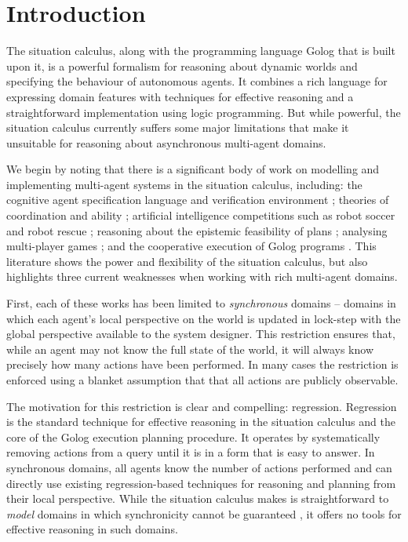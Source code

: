 

\chapter{Introduction}

\label{ch:intro}

The situation calculus, along with the programming language Golog
that is built upon it, is a powerful formalism for reasoning about
dynamic worlds and specifying the behaviour of autonomous agents.
It combines a rich language for expressing domain features with techniques
for effective reasoning and a straightforward implementation using
logic programming. But while powerful, the situation calculus currently
suffers some major limitations that make it unsuitable for reasoning
about asynchronous multi-agent domains.

We begin by noting that there is a significant body of work on modelling
and implementing multi-agent systems in the situation calculus, including:
the cognitive agent specification language and verification environment
\citep{shapiro02casl}; theories of coordination and ability \citep{ghaderi07sc_joint_ability};
artificial intelligence competitions such as robot soccer \citep{Ferrein2005readylog}
and robot rescue \citep{farinelli07team_golog}; reasoning about the
epistemic feasibility of plans \citep{Lesperance01epi_feas_casl};
analysing multi-player games \citep{delgrande01sitcalc_cleudo}; and
the cooperative execution of Golog programs \citep{Ferrein2005readylog,kelly06hlp_dps}.
This literature shows the power and flexibility of the situation calculus,
but also highlights three current weaknesses when working with rich
multi-agent domains.

First, each of these works has been limited to \emph{synchronous}
domains -- domains in which each agent's local perspective on the
world is updated in lock-step with the global perspective available
to the system designer. This restriction ensures that, while an agent
may not know the full state of the world, it will always know precisely
how many actions have been performed. In many cases the restriction
is enforced using a blanket assumption that that all actions are publicly
observable.

The motivation for this restriction is clear and compelling: regression.
Regression is the standard technique for effective reasoning in the
situation calculus and the core of the Golog execution planning procedure.
It operates by systematically removing actions from a query until
it is in a form that is easy to answer. In synchronous domains, all
agents know the number of actions performed and can directly use existing
regression-based techniques for reasoning and planning from their
local perspective. While the situation calculus makes is straightforward
to \emph{model} domains in which synchronicity cannot be guaranteed
\citep{Lesperance99sitcalc_approach}, it offers no tools for effective
reasoning in such domains.


